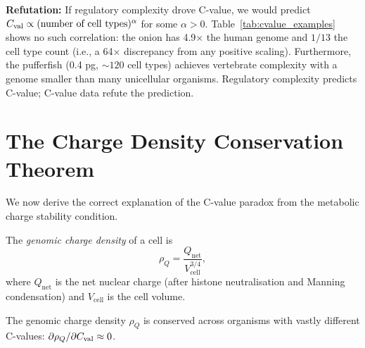\textbf{Refutation:} If regulatory complexity drove C-value, we would
predict $C_{\mathrm{val}} \propto (\text{number of cell types})^{\alpha}$ for some
$\alpha > 0$. Table~\ref{tab:cvalue_examples} shows no such correlation:
the onion has 4.9$\times$ the human genome and $1/13$ the cell type
count (i.e., a 64$\times$ discrepancy from any positive scaling).
Furthermore, the pufferfish (0.4 pg, $\sim 120$ cell types) achieves
vertebrate complexity with a genome smaller than many unicellular
organisms. Regulatory complexity predicts C-value; C-value data
refute the prediction.

\section{The Charge Density Conservation Theorem}
\label{sec:charge_conservation}

We now derive the correct explanation of the C-value paradox from the
metabolic charge stability condition.

\begin{definition}
\label{def:charge_density}
The \emph{genomic charge density} of a cell is
\begin{equation}
  \rho_Q = \frac{Q_{\mathrm{net}}}{V_{\mathrm{cell}}^{3/4}},
  \label{eq:charge_density}
\end{equation}
where $Q_{\mathrm{net}}$ is the net nuclear charge (after histone
neutralisation and Manning condensation) and $V_{\mathrm{cell}}$ is
the cell volume.
\end{definition}

\begin{theorem}
\label{thm:charge_conservation}
The genomic charge density $\rho_Q$ is conserved across organisms with
vastly different C-values: $\partial\rho_Q / \partial C_{\mathrm{val}} \approx 0$.
\end{theorem}

